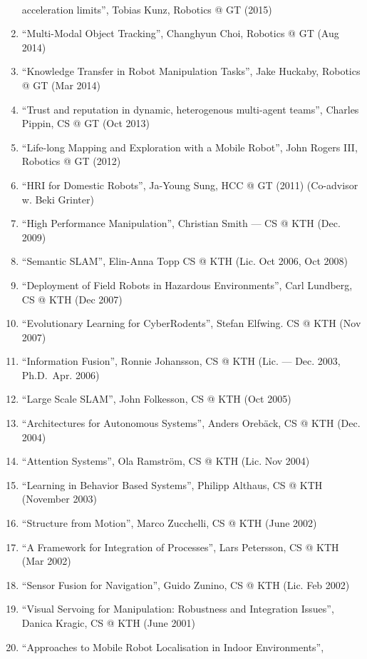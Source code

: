 \documentclass{article}
\begin{document}
\begin{cv}
\begin{cvlist}{~}
\begin{enumerate}
          acceleration limits'', Tobias Kunz, Robotics @ GT (2015)
    \item ``Multi-Modal Object Tracking'', Changhyun Choi, Robotics @ GT (Aug
          2014)
    \item ``Knowledge Transfer in Robot Manipulation Tasks'', Jake Huckaby,
          Robotics @ GT (Mar 2014)
    \item ``Trust and reputation in dynamic, heterogenous multi-agent teams'',
          Charles Pippin, CS @ GT (Oct 2013)
    \item ``Life-long Mapping and Exploration with a Mobile Robot'', John Rogers
          III, Robotics @ GT (2012)
    \item ``HRI for Domestic Robots'', Ja-Young Sung, HCC @ GT (2011)
          (Co-advisor w. Beki Grinter)
    \item ``High Performance Manipulation'', Christian Smith --- CS @ KTH (Dec.
          2009)
    \item ``Semantic SLAM'', Elin-Anna Topp CS @ KTH (Lic. Oct 2006, Oct 2008)
    \item ``Deployment of Field Robots in Hazardous Environments'', Carl
          Lundberg, CS @ KTH (Dec 2007)
    \item ``Evolutionary Learning for CyberRodents'', Stefan Elfwing. CS @ KTH
          (Nov 2007)
    \item ``Information Fusion'', Ronnie Johansson, CS @ KTH (Lic. --- Dec. 2003,
          Ph.D.\ Apr. 2006)
    \item ``Large Scale SLAM'', John Folkesson, CS @ KTH (Oct 2005)
    \item ``Architectures for Autonomous Systems'', Anders Oreb{\"a}ck, CS @ KTH
          (Dec. 2004)
    \item ``Attention Systems'', Ola Ramstr\"om, CS @ KTH (Lic. Nov 2004)
    \item ``Learning in Behavior Based Systems'', Philipp Althaus, CS @ KTH
          (November 2003)
    \item ``Structure from Motion'', Marco Zucchelli, CS @ KTH (June 2002)
    \item ``A Framework for Integration of Processes'', Lars Petersson, CS @ KTH
          (Mar 2002)
    \item ``Sensor Fusion for Navigation'', Guido Zunino, CS @ KTH (Lic. Feb
          2002)
    \item ``Visual Servoing for Manipulation: Robustness and Integration
          Issues'', Danica Kragic, CS @ KTH (June 2001)
    \item ``Approaches to Mobile Robot Localisation in Indoor Environments'',

\end{enumerate}
\end{cvlist}
\end{cv}
\end{document}
